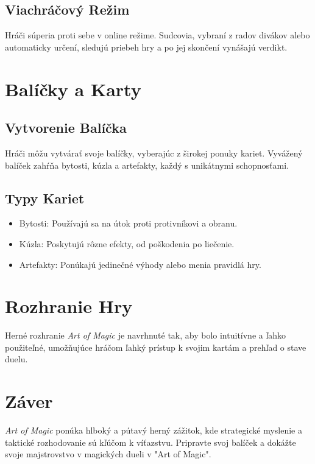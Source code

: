 \documentclass[12pt]{article}
\begin{document}
\subsection{Viachráčový Režim}
Hráči súperia proti sebe v online režime. Sudcovia, vybraní z radov divákov alebo automaticky určení, sledujú priebeh hry a po jej skončení vynášajú verdikt.

\section{Balíčky a Karty}
\subsection*{Vytvorenie Balíčka}
Hráči môžu vytvárať svoje balíčky, vyberajúc z širokej ponuky kariet. Vyvážený balíček zahŕňa bytosti, kúzla a artefakty, každý s unikátnymi schopnosťami.

\subsection{Typy Kariet}
\begin{itemize}
    \item Bytosti: Používajú sa na útok proti protivníkovi a obranu.
    \item Kúzla: Poskytujú rôzne efekty, od poškodenia po liečenie.
    \item Artefakty: Ponúkajú jedinečné výhody alebo menia pravidlá hry.
\end{itemize}

\section{Rozhranie Hry}
Herné rozhranie \textit{Art of Magic} je navrhnuté tak, aby bolo intuitívne a ľahko použiteľné, umožňujúce hráčom ľahký prístup k svojim kartám a prehľad o stave duelu.

\section{Záver}
\textit{Art of Magic} ponúka hlboký a pútavý herný zážitok, kde strategické myslenie a taktické rozhodovanie sú kľúčom k víťazstvu. Pripravte svoj balíček a dokážte svoje majstrovstvo v magických dueli v "Art of Magic".
\end{document}

